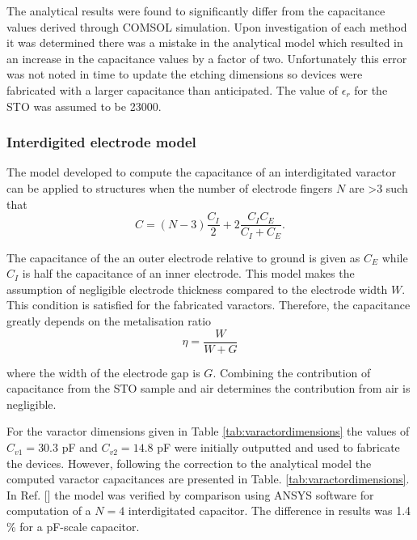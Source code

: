 The analytical results were found to significantly differ from the capacitance values derived through COMSOL simulation. Upon investigation of each method it was determined there was a mistake in the analytical model which resulted in an increase in the capacitance values by a factor of two. Unfortunately this error was not noted in time to update the etching dimensions so devices were fabricated with a larger capacitance than anticipated. The value of $\epsilon_{r}$ for the STO was assumed to be 23000.   

\subsubsection{\label{subsubsection:interdigitedelectrodemodel}Interdigited electrode model}
The model developed to compute the capacitance of an interdigitated varactor can be applied to structures when the number of electrode fingers $N$ are >3 such that 
\begin{equation}
\label{eq:capacitanceinterdigited}
C=(N-3) \frac{C_{I}}{2}+2\frac{C_{I}C_{E}}{C_{I}+C_{E}}.
\end{equation}

\noindent The capacitance of the an outer electrode relative to ground is given as $C_{E}$ while $C_{I}$ is half the capacitance of an inner electrode. This model makes the assumption of negligible electrode thickness compared to the electrode width $W$. This condition is satisfied for the fabricated varactors. Therefore, the capacitance greatly depends on the metalisation ratio
\begin{equation}
\label{eq:metalisationratio}
\eta =\frac{W}{W+G}
\end{equation}

where the width of the electrode gap is $G$. Combining the contribution of capacitance from the STO sample and air determines the contribution from air is negligible. 

For the varactor dimensions given in Table \ref{tab:varactordimensions} the values of $C_{v1}=30.3$ pF and $C_{v2}=14.8$ pF were initially outputted and used to fabricate the devices. However, following the correction to the analytical model the computed varactor capacitances are presented in Table. \ref{tab:varactordimensions}. In Ref. [\citep{Igreja2004AnalyticalStructure}] the model was verified by comparison using ANSYS software for computation of a $N=4$ interdigitated capacitor. The difference in results was 1.4 \% for a pF-scale capacitor.    

